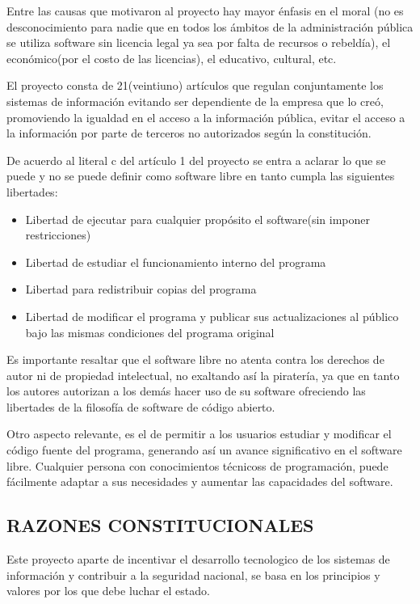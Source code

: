 Entre las causas que motivaron al proyecto hay mayor énfasis en
el moral (no es desconocimiento para nadie que en todos los
ámbitos de la administración pública se utiliza software sin
licencia legal ya sea por falta de recursos o rebeldía), el
económico(por el costo de las licencias), el educativo, cultural,
etc.

El proyecto consta de 21(veintiuno) artículos que regulan
conjuntamente los sistemas de información evitando ser
dependiente de la empresa que lo creó, promoviendo la igualdad
en el acceso a la información pública, evitar el acceso a la
información por parte de terceros no autorizados según la
constitución.

De acuerdo al literal c del artículo 1 del proyecto se entra a
aclarar lo que se puede y no se puede definir como software
libre en tanto cumpla las siguientes libertades:

\begin{itemize}
  \item Libertad de ejecutar para cualquier propósito el
	software(sin imponer restricciones)
  \item Libertad de estudiar el funcionamiento interno del
	programa
  \item Libertad para redistribuir copias del programa
  \item Libertad de modificar el programa y publicar sus
	actualizaciones al público bajo las mismas condiciones del
	programa original
\end{itemize}

Es importante resaltar que el software libre no atenta contra los
derechos de autor ni de propiedad intelectual, no exaltando así
la piratería, ya que en tanto los autores autorizan a los demás
hacer uso de su software ofreciendo las libertades de la filosofía
de software de código abierto.

Otro aspecto relevante, es el de permitir a los usuarios estudiar
y modificar el código fuente del programa, generando así un
avance significativo en el software libre. Cualquier persona con
conocimientos técnicoss de programación, puede fácilmente
adaptar a sus necesidades y aumentar las capacidades del
software.

\subsection*{RAZONES CONSTITUCIONALES}
Este proyecto aparte de incentivar el desarrollo tecnologico de
los sistemas de información y contribuir a la seguridad nacional,
se basa en los principios y valores por los que debe luchar el
estado.

